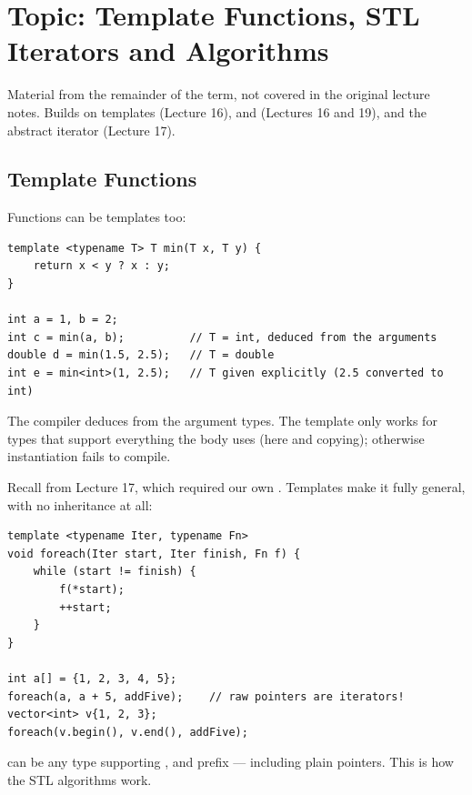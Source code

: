 \chapter{Topic: Template Functions, STL Iterators and Algorithms}

\begin{aside}
Material from the remainder of the term, not covered in the original lecture
notes. Builds on templates (Lecture 16),  and 
(Lectures 16 and 19), and the abstract iterator (Lecture 17).
\end{aside}

\section{Template Functions}
Functions can be templates too:
\begin{lstlisting}[style=cpp]
template <typename T> T min(T x, T y) {
    return x < y ? x : y;
}

int a = 1, b = 2;
int c = min(a, b);          // T = int, deduced from the arguments
double d = min(1.5, 2.5);   // T = double
int e = min<int>(1, 2.5);   // T given explicitly (2.5 converted to int)
\end{lstlisting}
The compiler deduces  from the argument types. The template only works
for types  that support everything the body uses (here
 and copying); otherwise instantiation fails to compile.

Recall  from Lecture 17, which required our own .
Templates make it fully general, with no inheritance at all:
\begin{lstlisting}[style=cpp]
template <typename Iter, typename Fn>
void foreach(Iter start, Iter finish, Fn f) {
    while (start != finish) {
        f(*start);
        ++start;
    }
}

int a[] = {1, 2, 3, 4, 5};
foreach(a, a + 5, addFive);    // raw pointers are iterators!
vector<int> v{1, 2, 3};
foreach(v.begin(), v.end(), addFive);
\end{lstlisting}
 can be any type supporting \code{!=}, \code{*} and prefix
\code{++} --- including plain pointers. This is how the STL algorithms work.

